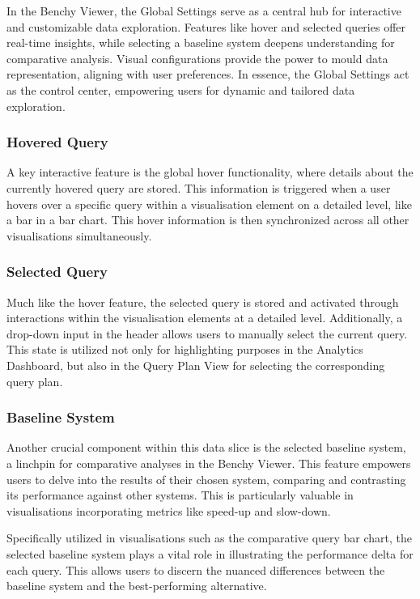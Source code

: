 In the Benchy Viewer, the Global Settings serve as a central hub for interactive and customizable data exploration. Features like hover and selected queries offer real-time insights, while selecting a baseline system deepens understanding for comparative analysis. Visual configurations provide the power to mould data representation, aligning with user preferences. In essence, the Global Settings act as the control center, empowering users for dynamic and tailored data exploration.

\subsubsection{Hovered Query}

A key interactive feature is the global hover functionality, where details about the currently hovered query are stored. This information is triggered when a user hovers over a specific query within a visualisation element on a detailed level, like a bar in a bar chart. This hover information is then synchronized across all other visualisations simultaneously.

\subsubsection{Selected Query}

Much like the hover feature, the selected query is stored and activated through interactions within the visualisation elements at a detailed level. Additionally, a drop-down input in the header allows users to manually select the current query. This state is utilized not only for highlighting purposes in the Analytics Dashboard, but also in the Query Plan View for selecting the corresponding query plan.

\subsubsection{Baseline System}

Another crucial component within this data slice is the selected baseline system, a linchpin for comparative analyses in the Benchy Viewer. This feature empowers users to delve into the results of their chosen system, comparing and contrasting its performance against other systems. This is particularly valuable in visualisations incorporating metrics like speed-up and slow-down.

Specifically utilized in visualisations such as the comparative query bar chart, the selected baseline system plays a vital role in illustrating the performance delta for each query. This allows users to discern the nuanced differences between the baseline system and the best-performing alternative. 

